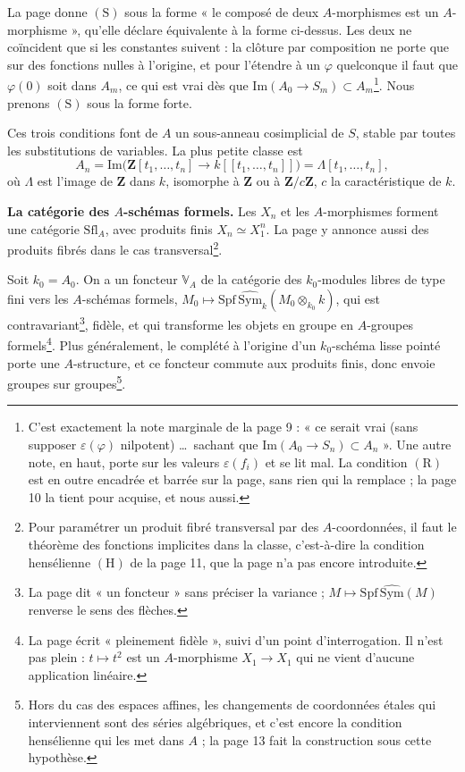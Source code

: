 \documentclass[11pt,a4paper]{article}
\begin{document}
La page donne $(\mathrm{S})$ sous la forme « le composé de deux $A$-morphismes
est un $A$-morphisme », qu'elle déclare équivalente à la forme ci-dessus. Les
deux ne coïncident que si les constantes suivent : la clôture par composition
ne porte que sur des fonctions nulles à l'origine, et pour l'étendre à un
$\varphi$ quelconque il faut que $\varphi(0)$ soit dans $A_m$, ce qui est vrai dès
que $\mathrm{Im}(A_0 \to S_m) \subset A_m$\footnote{C'est exactement la note
marginale de la page 9 : « ce serait vrai (sans supposer $\varepsilon(\varphi)$
nilpotent) \ldots\ sachant que $\mathrm{Im}(A_0 \to S_n) \subset A_n$ ». Une
autre note, en haut, porte sur les valeurs $\varepsilon(f_i)$ et se lit mal.
La condition $(\mathrm{R})$ est en outre encadrée et barrée sur la page, sans
rien qui la remplace ; la page 10 la tient pour acquise, et nous aussi.}. Nous
prenons $(\mathrm{S})$ sous la forme forte.

Ces trois conditions font de $A$ un sous-anneau cosimplicial de $S$, stable par
toutes les substitutions de variables. La plus petite classe est
\[
  A_n = \mathrm{Im}\bigl(\mathbf{Z}[t_1, \ldots, t_n] \to k[[t_1, \ldots, t_n]]\bigr)
  = \Lambda[t_1, \ldots, t_n],
\]
où $\Lambda$ est l'image de $\mathbf{Z}$ dans $k$, isomorphe à $\mathbf{Z}$ ou à
$\mathbf{Z}/c\mathbf{Z}$, $c$ la caractéristique de $k$.

\textbf{La catégorie des $A$-schémas formels.} Les $X_n$ et les
$A$-morphismes forment une catégorie $\mathrm{Sfl}_A$, avec produits finis
$X_n \simeq X_1^n$. La page y annonce aussi des produits fibrés dans le cas
transversal\footnote{Pour paramétrer un produit fibré transversal par des
$A$-coordonnées, il faut le théorème des fonctions implicites dans la classe,
c'est-à-dire la condition hensélienne $(\mathrm{H})$ de la page 11, que la
page n'a pas encore introduite.}.

Soit $k_0 = A_0$. On a un foncteur $\mathbb{V}_A$ de la catégorie des
$k_0$-modules libres de type fini vers les $A$-schémas formels,
$M_0 \mapsto \mathrm{Spf}\, \widehat{\mathrm{Sym}}_k(M_0 \otimes_{k_0} k)$, qui
est contravariant\footnote{La page dit « un foncteur » sans préciser la
variance ; $M \mapsto \mathrm{Spf}\,\widehat{\mathrm{Sym}}(M)$ renverse le sens des
flèches.}, fidèle, et qui transforme les objets en groupe en $A$-groupes
formels\footnote{La page écrit « pleinement fidèle », suivi d'un point
d'interrogation. Il n'est pas plein : $t \mapsto t^2$ est un $A$-morphisme
$X_1 \to X_1$ qui ne vient d'aucune application linéaire.}. Plus
généralement, le complété à l'origine d'un $k_0$-schéma lisse pointé porte une
$A$-structure, et ce foncteur commute aux produits finis, donc envoie groupes
sur groupes\footnote{Hors du cas des espaces affines, les changements de
coordonnées étales qui interviennent sont des séries algébriques, et c'est
encore la condition hensélienne qui les met dans $A$ ; la page 13 fait la
construction sous cette hypothèse.}.
\end{document}

